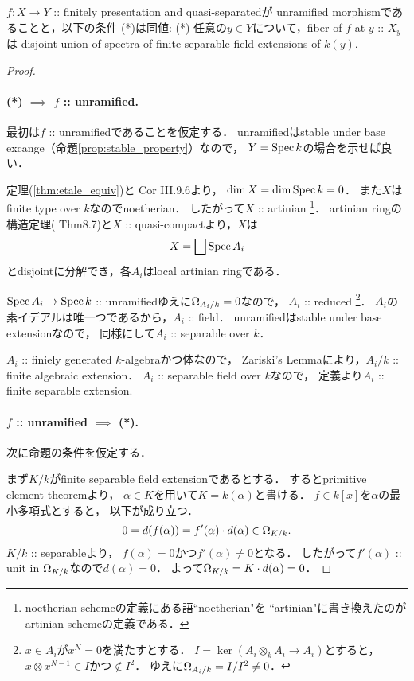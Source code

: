 \documentclass[a4paper, dvipdfmx]{jsarticle}
\begin{document}
\begin{Prop} \label{prop:unram_qfinite}
    $f \colon X \to Y$ :: finitely presentation and quasi-separatedが
    unramified morphismであることと，以下の条件 (*)は同値:
    (*)
    任意の$y \in Y$について，fiber of $f$ at $y$ :: $X_y$は
    disjoint union of spectra of finite separable field extensions of $k(y)$.
\end{Prop}
\begin{proof}
    \paragraph{(*) $\implies$ $f$ :: unramified.}
    最初は$f$ :: unramifiedであることを仮定する．
    unramifiedはstable under base excange（命題\ref{prop:stable_property}）なので，
    $Y=\operatorname{Spec} k$の場合を示せば良い．

    定理(\ref{thm:etale_equiv})と\cite{HarAG} Cor III.9.6より，
    $\dim X=\dim \operatorname{Spec} k=0$．
    また$X$はfinite type over $k$なのでnoetherian．
    したがって$X$ :: artinian
    \footnote{ noetherian schemeの定義にある語``noetherian"を
                ``artinian"に書き換えたのがartinian schemeの定義である． }．
    artinian ringの構造定理(\cite{Ati-Mac} Thm8.7)と$X$ :: quasi-compactより，$X$は
    \[ X=\bigsqcup \operatorname{Spec} A_i \]
    とdisjointに分解でき，各$A_i$はlocal artinian ringである．

    $\operatorname{Spec} A_i \to \operatorname{Spec} k$ :: unramifiedゆえに$\Omega_{A_i/k}=0$なので，
    $A_i$ :: reduced
    \footnote
    {
        $x \in A_i$が$x^{N}=0$を満たすとする．
        $I=\ker(A_i \otimes_k A_i \to A_i)$とすると，
        $x \otimes x^{N-1} \in I$かつ$\not \in I^2$．
        ゆえに$\Omega_{A_i/k}=I/I^2 \neq 0$．
    }．
    $A_i$の素イデアルは唯一つであるから，$A_i$ :: field．
    unramifiedはstable under base extensionなので，
    同様にして$A_i$ :: separable over $k$．

    $A_i$ :: finiely generated $k$-algebraかつ体なので，
    Zariski's Lemmaにより，$A_i/k$ :: finite algebraic extension．
    $A_i$ :: separable field over $k$なので，
    定義より$A_i$ :: finite separable extension.

    \paragraph{$f$ :: unramified $\implies$ (*).}
    次に命題の条件を仮定する．

    まず$K/k$がfinite separable field extensionであるとする．
    するとprimitive element theoremより，
    $\alpha \in K$を用いて$K=k(\alpha)$と書ける．
    $f \in k[x]$を$\alpha$の最小多項式とすると，
    以下が成り立つ．
    \[ 0=d(f(\alpha))=f'(\alpha) \cdot d(\alpha) \in \Omega_{K/k}. \]
    $K/k$ :: separableより，
    $f(\alpha)=0$かつ$f'(\alpha) \neq 0$となる．
    したがって$f'(\alpha)$ :: unit in $\Omega_{K/k}$なので$d(\alpha)=0$．
    よって$\Omega_{K/k}=K \cdot d(\alpha)=0$．


\end{proof}
\end{document}
